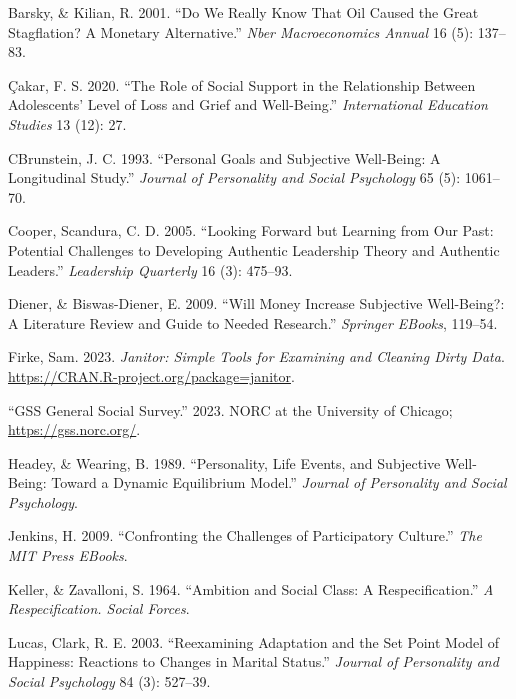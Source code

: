 \documentclass[
  letterpaper,
  DIV=11,
  numbers=noendperiod]{scrartcl}
\newlength{\cslhangindent}
\newlength{\cslentryspacingunit} %
\newenvironment{CSLReferences}[2] %
 {%
  \setlength{\parindent}{0pt}
  \ifodd #1
  \let\oldpar\par
  \def\par{\hangindent=\cslhangindent\oldpar}
  \fi
  \setlength{\parskip}{#2\cslentryspacingunit}
 }%
 {}
\begin{document}
\hypertarget{refs}{}
\begin{CSLReferences}{1}{0}
\leavevmode{}%
Barsky, \& Kilian, R. 2001. {``Do We Really Know That Oil Caused the
Great Stagflation? A Monetary Alternative.''} \emph{Nber Macroeconomics
Annual} 16 (5): 137--83.

\leavevmode{}%
Çakar, F. S. 2020. {``The Role of Social Support in the Relationship
Between Adolescents' Level of Loss and Grief and Well-Being.''}
\emph{International Education Studies} 13 (12): 27.

\leavevmode{}%
CBrunstein, J. C. 1993. {``Personal Goals and Subjective Well-Being: A
Longitudinal Study.''} \emph{Journal of Personality and Social
Psychology} 65 (5): 1061--70.

\leavevmode{}%
Cooper, Scandura, C. D. 2005. {``Looking Forward but Learning from Our
Past: Potential Challenges to Developing Authentic Leadership Theory and
Authentic Leaders.''} \emph{Leadership Quarterly} 16 (3): 475--93.

\leavevmode{}%
Diener, \& Biswas-Diener, E. 2009. {``Will Money Increase Subjective
Well-Being?: A Literature Review and Guide to Needed Research.''}
\emph{Springer EBooks}, 119--54.

\leavevmode{}%
Firke, Sam. 2023. \emph{Janitor: Simple Tools for Examining and Cleaning
Dirty Data}. \url{https://CRAN.R-project.org/package=janitor}.

\leavevmode{}%
{``GSS General Social Survey.''} 2023. NORC at the University of
Chicago; \url{https://gss.norc.org/}.

\leavevmode{}%
Headey, \& Wearing, B. 1989. {``Personality, Life Events, and Subjective
Well-Being: Toward a Dynamic Equilibrium Model.''} \emph{Journal of
Personality and Social Psychology}.

\leavevmode{}%
Jenkins, H. 2009. {``Confronting the Challenges of Participatory
Culture.''} \emph{The MIT Press EBooks}.

\leavevmode{}%
Keller, \& Zavalloni, S. 1964. {``Ambition and Social Class: A
Respecification.''} \emph{A Respecification. Social Forces}.

\leavevmode{}%
Lucas, Clark, R. E. 2003. {``Reexamining Adaptation and the Set Point
Model of Happiness: Reactions to Changes in Marital Status.''}
\emph{Journal of Personality and Social Psychology} 84 (3): 527--39.


\end{CSLReferences}
\end{document}
